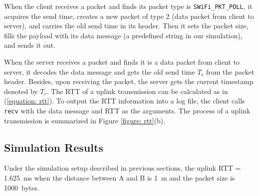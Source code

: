 \documentclass{article}
\begin{document}
When the client receives a packet and finds its packet type is
\lstinline|SWiFi_PKT_POLL|, it acquires the send time, creates a new packet of
type 2 (data packet from client to server), and carries the old send time in its
header. Then it sets the packet size, fills the payload with its data message
(a predefined string in our simulation), and sends it out.

When the server receives a packet and finds it is a data packet from client to
server, it decodes the data message and gets the old send time $T_\text{s}$ from
the packet header. Besides, upon receiving the packet, the server gets the current timestamp denoted by $T_r$. The RTT of a uplink transmission can be calculated as in (\ref{equation: rtt}).
To output the RTT information into a log file, the client calls \lstinline|recv| with the data message and RTT as the arguments. The process of a uplink transmission is summarized in Figure \ref{figure: rtt}(b).

\subsection{Simulation Results}
Under the simulation setup described in previous sections, the uplink RTT = \SI{1.625}{ms} when the distance between A and B is \SI{1}{m} and the packet size is \SI{1000}{bytes}. \\
\end{document}
